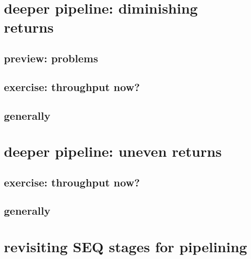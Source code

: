 

\section{deeper pipeline: diminishing returns}


\subsection{preview: problems}


\subsection{exercise: throughput now?}


\subsection{generally}



    
\section{deeper pipeline: uneven returns}



\subsection{exercise: throughput now?}


\subsection{generally}


    
 
\section{revisiting SEQ stages for pipelining}

